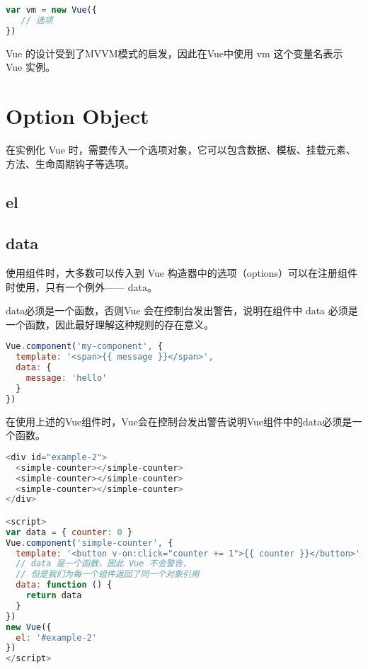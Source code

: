 \begin{lstlisting}[language=JavaScript]
var vm = new Vue({
   // 选项
})
\end{lstlisting}


 Vue 的设计受到了MVVM模式的启发，因此在Vue中使用 vm 这个变量名表示 Vue 实例。
 
 

 
 \section{Option Object}


在实例化 Vue 时，需要传入一个选项对象，它可以包含数据、模板、挂载元素、方法、生命周期钩子等选项。

\subsection{el}


\subsection{data}


使用组件时，大多数可以传入到 Vue 构造器中的选项（options）可以在注册组件时使用，只有一个例外—— data。

data必须是一个函数，否则Vue 会在控制台发出警告，说明在组件中 data 必须是一个函数，因此最好理解这种规则的存在意义。



\begin{lstlisting}[language=JavaScript]
Vue.component('my-component', {
  template: '<span>{{ message }}</span>',
  data: {
    message: 'hello'
  }
})
\end{lstlisting}

在使用上述的Vue组件时，Vue会在控制台发出警告说明Vue组件中的data必须是一个函数。

\begin{lstlisting}[language=JavaScript]
<div id="example-2">
  <simple-counter></simple-counter>
  <simple-counter></simple-counter>
  <simple-counter></simple-counter>
</div>

<script>
var data = { counter: 0 }
Vue.component('simple-counter', {
  template: '<button v-on:click="counter += 1">{{ counter }}</button>',
  // data 是一个函数，因此 Vue 不会警告，
  // 但是我们为每一个组件返回了同一个对象引用
  data: function () {
    return data
  }
})
new Vue({
  el: '#example-2'
})
</script>
\end{lstlisting}

